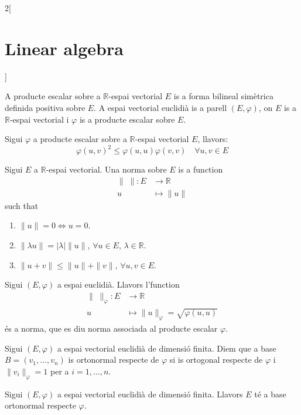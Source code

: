 \documentclass[../../../main.tex]{subfiles}
\begin{document}
\begin{multicols}{2}[\section{Linear algebra}]
\begin{definition}
A producte escalar sobre a $\mathbb{R}$-espai vectorial $E$ is a forma bilineal simètrica definida positiva sobre $E$. A espai vectorial euclidià is a parell $(E,\varphi)$, on $E$ is a $\mathbb{R}$-espai vectorial i $\varphi$ is a producte escalar sobre $E$.\label{espai_euclidia}
\end{definition}
\begin{theorem}
Sigui $\varphi$ a producte escalar sobre a $\mathbb{R}$-espai vectorial $E$, llavors: $$\varphi(u,v)^2\leq \varphi(u,u)\varphi(v,v)\quad\forall u,v\in E$$
\end{theorem}
\begin{definition}
Sigui $E$ a $\mathbb{R}$-espai vectorial. Una norma sobre $E$ is a function \begin{align*}
    \|\;\|:E&\rightarrow\mathbb{R}\\
    u&\mapsto\|u\|
\end{align*}
such that \begin{enumerate}
    \item $\|u\|=0\iff u=0$.
    \item $\|\lambda u\|=|\lambda|\|u\|$, $\forall u\in E$, $\lambda\in\mathbb{R}$.
    \item $\|u+v\|\leq\|u\|+\|v\|$, $\forall u,v\in E$.
\end{enumerate}
\end{definition}
\begin{prop}
Sigui $(E,\varphi)$ a espai euclidià. Llavors l'function
\begin{align*}
    \|\;\|_\varphi:E&\rightarrow\mathbb{R}\\
    u&\mapsto\|u\|_\varphi=\sqrt{\varphi(u,u)}
\end{align*}
és a norma, que es diu norma associada al producte escalar $\varphi$.
\end{prop}
\begin{definition}
Sigui $(E,\varphi)$ a espai vectorial euclidià de dimensió finita. Diem que a base $B=(v_1,\ldots,v_n)$ is ortonormal respecte de $\varphi$ si is ortogonal respecte de $\varphi$ i $\|v_i\|_\varphi=1$ per a $i=1,\ldots,n$.
\end{definition}
\begin{corollary}
Sigui $(E,\varphi)$ a espai vectorial euclidià de dimensió finita. Llavors $E$ té a base ortonormal respecte $\varphi$.
\end{corollary}
\begin{definition}

\end{definition}
\end{multicols}
\end{document}
